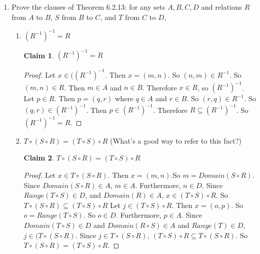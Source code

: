 \documentclass[11pt]{letter}
\newtheorem{claim}{Claim}
\theoremstyle{definition}
\begin{document}
\begin{description}
\begin{enumerate}
                  
		\item Prove the clauses of Theorem 6.2.13: for any sets $A,B, C, D$ and relations $R$ from $A$ to $B$, $S$ from $B$ to $C$, and $T$ from $C$ to $D$,

                  
			\begin{enumerate}
			\item $\left(R^{-1}\right)^{-1}=R$
                          \begin{claim}
                            $\left(R^{-1}\right)^{-1}=R$
                          \end{claim}
                          \begin{proof}
                            Let $x\in (\left (R^{-1}\right)^{-1}$. Then $x=(m,n)$. So $(n,m)\in R^{-1}$. So $(m,n)\in R$. Then $m\in A$ and $n\in B$. Therefore $x\in R$, so $\left(R^{-1}\right)^{-1}$.\\
                            Let $p \in R$. Then $p=(q,r)$ where $q\in A$ and $r\in B$. So $(r,q)\in R^{-1}$. So $(q,r)\in \left(R^{-1} \right)^{-1}$. Then $p \in \left(R^{-1} \right)^{-1}$. Therefore $R \subseteq \left(R^{-1}\right)^{-1}$. So $\left(R^{-1}\right)^{-1}=R$. 
                          \end{proof}
                          
                             
			\item $T\circ (S\circ R)=(T\circ S)\circ R$ (What's a good way to refer to this fact?)
                          \begin{claim}
                            $T\circ (S\circ R)=(T\circ S)\circ R$
                          \end{claim}
                          \begin{proof}
                            Let $x\in T\circ (S\circ R)$. Then $x=(m,n)$.So $m=Domain(S\circ R)$. Since $Domain(S \circ R)\in A$, $m\in A$. Furthermore, $n\in D$. Since $Range(T\circ S)\in D$, and $Domain(R)\in A$, $x\in (T\circ S)\circ R$. So $T\circ (S\circ R)\subseteq (T\circ S)\circ R$
                            Let $j\in (T\circ S)\circ R$. Then $x=(o,p)$. So $o=Range(T\circ S)$. So $o\in D$. Furthermore, $p\in A$. Since $Domain(T\circ S)\in D$ and $Domain(R\circ S)\in A$ and $Range(T)\in D$, $j\in (T\circ (S\circ R)$. Since $j\in T\circ(S\circ R)$, $(T\circ S)\circ R\subseteq T\circ (S\circ R)$. So $T\circ (S\circ R)=(T\circ S)\circ R$.
                          \end{proof}
                          

\end{enumerate}
\end{enumerate}
\end{description}
\end{document}
